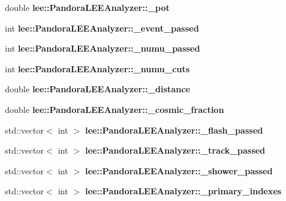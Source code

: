 \begin{DoxyCompactItemize}
\item 
\hypertarget{group__lee_gab9e2d69bbb1796181bfb0b73b3571327}{double {\bfseries lee\-::\-Pandora\-L\-E\-E\-Analyzer\-::\-\_\-pot}}\label{group__lee_gab9e2d69bbb1796181bfb0b73b3571327}

\item 
\hypertarget{group__lee_gae2220a696ef93026eca209bb981ffbdd}{int {\bfseries lee\-::\-Pandora\-L\-E\-E\-Analyzer\-::\-\_\-event\-\_\-passed}}\label{group__lee_gae2220a696ef93026eca209bb981ffbdd}

\item 
\hypertarget{group__lee_ga5358fd908f314be50f85ea97523fbca4}{int {\bfseries lee\-::\-Pandora\-L\-E\-E\-Analyzer\-::\-\_\-numu\-\_\-passed}}\label{group__lee_ga5358fd908f314be50f85ea97523fbca4}

\item 
\hypertarget{group__lee_ga50ca292dbf6464fa2845f4aed51f79b7}{int {\bfseries lee\-::\-Pandora\-L\-E\-E\-Analyzer\-::\-\_\-numu\-\_\-cuts}}\label{group__lee_ga50ca292dbf6464fa2845f4aed51f79b7}

\item 
\hypertarget{group__lee_ga67ddd5bec66667568bc59b0dfa13839a}{double {\bfseries lee\-::\-Pandora\-L\-E\-E\-Analyzer\-::\-\_\-distance}}\label{group__lee_ga67ddd5bec66667568bc59b0dfa13839a}

\item 
\hypertarget{group__lee_ga9d3deef73e6dd40b958cb4709ddea35c}{double {\bfseries lee\-::\-Pandora\-L\-E\-E\-Analyzer\-::\-\_\-cosmic\-\_\-fraction}}\label{group__lee_ga9d3deef73e6dd40b958cb4709ddea35c}

\item 
\hypertarget{group__lee_ga39d4c9760193a606cfdeb7af7195486c}{std\-::vector$<$ int $>$ {\bfseries lee\-::\-Pandora\-L\-E\-E\-Analyzer\-::\-\_\-flash\-\_\-passed}}\label{group__lee_ga39d4c9760193a606cfdeb7af7195486c}

\item 
\hypertarget{group__lee_ga222f64bba75838505ac948638260ed6b}{std\-::vector$<$ int $>$ {\bfseries lee\-::\-Pandora\-L\-E\-E\-Analyzer\-::\-\_\-track\-\_\-passed}}\label{group__lee_ga222f64bba75838505ac948638260ed6b}

\item 
\hypertarget{group__lee_ga677892512d8f61dd3783e04b2522925f}{std\-::vector$<$ int $>$ {\bfseries lee\-::\-Pandora\-L\-E\-E\-Analyzer\-::\-\_\-shower\-\_\-passed}}\label{group__lee_ga677892512d8f61dd3783e04b2522925f}

\item 
\hypertarget{group__lee_ga3020305a22a83591e103b8124140cea6}{std\-::vector$<$ int $>$ {\bfseries lee\-::\-Pandora\-L\-E\-E\-Analyzer\-::\-\_\-primary\-\_\-indexes}}\label{group__lee_ga3020305a22a83591e103b8124140cea6}


\end{DoxyCompactItemize}
